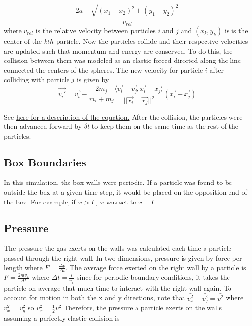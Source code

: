 \documentclass[12pt]{amsart}
\begin{document}
$$\frac{2a - \sqrt{(x_1 - x_2)^2 + (y_1 - y_2)^2}}{v_{rel}}  $$ 
\newline
where $v_{rel}$ is the relative velocity between particles $i$ and $j$ and $(x_k,y_k)$ is is the center of the $kth$ particle.  Now the particles collide and their respective velocities are updated such that momentum and energy are conserved.  To do this, the collision between them was modeled as an elastic forced directed along the line connected the centers of the spheres.  The new velocity for particle $i$ after colliding with particle $j$ is given by
$$ \vec{v_i'} = \vec{v_i} - \frac{2 m_j}{m_i + m_j} \frac{\langle \vec{v_i} - \vec{v_j}, \vec{x_i} - \vec{x_j}{ \rangle}}{||\vec{x_i} - \vec{x_j}||^2} (\vec{x_i} - \vec{x_j}) $$
  
 See \href{https://en.wikipedia.org/wiki/Elastic_collision#Two-dimensional_collision_with_two_moving_objects}{here for a description of the equation.}   After the collision, the particles were then advanced forward by $\delta t$ to keep them on the same time as the rest of the particles.
 
\subsection{Box Boundaries}

In this simulation, the box walls were periodic.  If a particle was found to be outside the box at a given time step, it would be placed on the opposition end of the box.  For example, if $x > L$, $x$ was set to $x - L$.  

\subsection{Pressure}

The pressure the gas exerts on the walls was calculated each time a particle passed through the right wall.  In two dimensions, pressure is given by force per length where $F = \frac{\Delta p}{\Delta t}$.  The average force exerted on the right wall by a particle is $F = \frac{2 m v_x}{\Delta t}$ where $\Delta t = \frac{l}{v_x}$ since for periodic boundary conditions, it takes the particle on average that much time to interact with the right wall again.  To account for motion in both the x and y directions, note that $\bar{v_x^2} + \bar{v_y^2} = \bar{v^2}$ where $\bar{v_x^2} = \bar{v_y^2}$ so $\bar{v_x^2} = \frac{1}{2} \bar{v^2}$ Therefore, the pressure a particle exerts on the walls assuming a perfectly elastic collision is
\end{document}
